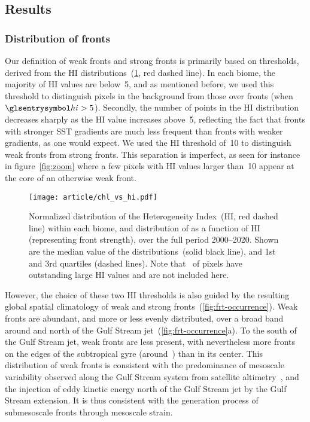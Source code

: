 \subsection{Results}

\subsubsection{Distribution of fronts}

Our definition of weak fronts and strong fronts is primarily based on thresholds, derived from the HI distributions~(\cref{fig:chl-vs-hi}, red dashed line).
In each biome, the majority of HI values are below~5, and as mentioned before, we used this threshold to distinguish pixels in the background from those over fronts (when \(\am{hi} > 5\)).
Secondly, the number of points in the HI distribution decreases sharply as the HI value increases above~5, reflecting the fact that fronts with stronger SST gradients are much less frequent than fronts with weaker gradients, as one would expect.
We used the HI threshold of~10 to distinguish weak fronts from strong fronts.
This separation is imperfect, as seen for instance in figure~\ref{fig:zoom} where a few pixels with HI values larger than~10 appear at the core of an otherwise weak front.

\begin{figure}
  \centering
  \texttt{[image: article/chl\_vs\_hi.pdf]}
  \caption[Distribution of  against ]{%
    Normalized distribution of the Heterogeneity Index~(HI, red dashed line) within each biome, and distribution of  as a function of HI (representing front strength), over the full period 2000--2020.
    Shown are the median value of the  distributions~(solid black line), and 1st and 3rd quartiles (dashed lines).
    Note that~ of pixels have outstanding large HI values and are not included here.
  }%
  \label{fig:chl-vs-hi}
\end{figure}

However, the choice of these two HI thresholds is also guided by the resulting global spatial climatology of weak and strong fronts~(\cref{fig:frt-occurrence}).
Weak fronts are abundant, and more or less evenly distributed, over a broad band around and north of the Gulf Stream jet~(\cref{fig:frt-occurrence}a).
To the south of the Gulf Stream jet, weak fronts are less present, with nevertheless more fronts on the edges of the subtropical gyre (around~) than in its center.
This distribution of weak fronts is consistent with the predominance of mesoscale variability observed along the Gulf Stream system from satellite altimetry~\parencite{zhai_2008}, and the injection of eddy kinetic energy north of the Gulf Stream jet by the Gulf Stream extension.
It is thus consistent with the generation process of submesoscale fronts through mesoscale strain.

